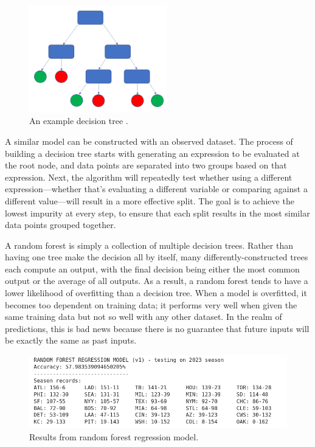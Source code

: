 \documentclass{paper}
\begin{document}
\begin{figure}[H]
  \centering
  \includegraphics[width=6cm]{fig14}
  \caption{An example decision tree \cite{randfor}.}
\end{figure}

A similar model can be constructed with an observed dataset. The process of building a decision tree starts with generating an expression to be evaluated at the root node, and data points are separated into two groups based on that expression. Next, the algorithm will repeatedly test whether using a different expression---whether that's evaluating a different variable or comparing against a different value---will result in a more effective split. The goal is to achieve the lowest impurity at every step, to ensure that each split results in the most similar data points grouped together.

A random forest is simply a collection of multiple decision trees. Rather than having one tree make the decision all by itself, many differently-constructed trees each compute an output, with the final decision being either the most common output or the average of all outputs. As a result, a random forest tends to have a lower likelihood of overfitting than a decision tree. When a model is overfitted, it becomes too dependent on training data; it performs very well when given the same training data but not so well with any other dataset. In the realm of predictions, this is bad news because there is no guarantee that future inputs will be exactly the same as past inputs.

\begin{figure}[H]
  \centering
  \includegraphics[width=13cm]{fig7}
  \caption{Results from random forest regression model.}
\end{figure}
\end{document}
